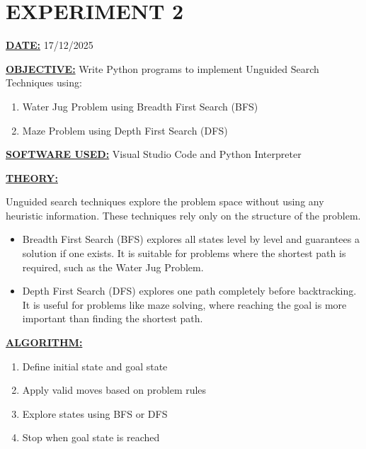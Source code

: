 \documentclass[12pt,a4paper]{article}
\begin{document}
\section{EXPERIMENT 2}
\vspace{0.5cm}

\textbf{\underline{DATE:}} 17/12/2025

\vspace{0.5cm}
\textbf{\underline{OBJECTIVE:}} Write Python programs to implement Unguided Search Techniques using:

\begin{enumerate}[label=\alph*)]
  \item Water Jug Problem using Breadth First Search (BFS)
  \item Maze Problem using Depth First Search (DFS)
\end{enumerate}

\vspace{0.5cm}
\textbf{\underline{SOFTWARE USED:}} Visual Studio Code and Python Interpreter

\vspace{0.5cm}
\textbf{\underline{THEORY:}}

Unguided search techniques explore the problem space without using any heuristic information. These techniques rely only on the structure of the problem.

\begin{itemize}
  \item Breadth First Search (BFS) explores all states level by level and guarantees a solution if one exists. It is suitable for problems where the shortest path is required, such as the Water Jug Problem.
  \item Depth First Search (DFS) explores one path completely before backtracking. It is useful for problems like maze solving, where reaching the goal is more important than finding the shortest path.
\end{itemize}

\vspace{0.5cm}
\textbf{\underline{ALGORITHM:}}
\begin{enumerate}
  \item Define initial state and goal state
  \item Apply valid moves based on problem rules
  \item Explore states using BFS or DFS
  \item Stop when goal state is reached
\end{enumerate}
\end{document}
